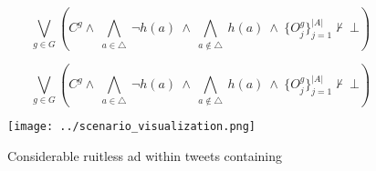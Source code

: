 \documentclass[a4paper]{article}
\begin{document}
\[\bigvee_{g\in G} (C^g \wedge\ \bigwedge_{a\in \triangle}\ \neg h(a)\ \wedge\ \bigwedge_{a\notin \triangle}\ h(a)\ \wedge\ \{O_j^g\}_{j=1}^{|A|} \nvdash\ \bot )\]

\[\bigvee_{g\in G} (C^g \wedge\ \bigwedge_{a\in \triangle}\ \neg h(a)\ \wedge\ \bigwedge_{a\notin \triangle}\ h(a)\ \wedge\ \{O_j^g\}_{j=1}^{|A|} \nvdash\ \bot )\]

\begin{figure}
\centering
\texttt{[image: ../scenario\_visualization.png]}
\caption{Considerable ruitless ad within tweets containing
}
\end{figure}
 
\end{document}
